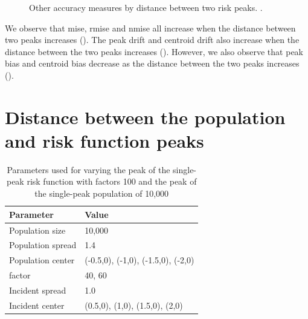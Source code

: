 \begin{figure}[htbp]
\begin{subfigure}[b]{0.49\textwidth}
        \caption{}
        \label{fig:other_measures:p1.4_100_G:centroid_drift}
    \end{subfigure}
    \caption[Other accuracy measures by distance between two risk peaks]
        {Other accuracy measures by distance between two risk peaks. \errorplotcaption.}
    \label{fig:other_measures:p1.4_100_G}
\end{figure}

We observe that \gls{mise}, \gls{rmise} and \gls{nmise} all increase when the distance between two peaks increases ().
The \gls{peak drift} and \gls{centroid drift} also increase when the distance between the two peaks increases ().
However, we also observe that \gls{peak bias} and \gls{centroid bias} decrease as the distance between the two peaks increases ().


\section{Distance between the population and risk function peaks}
\label{sec:results:p1.4_Gap_risk}

\begin{table}[htbp]
    \centering
    \begin{tabular}{ll}
        \toprule
        Parameter & Value \\
        \midrule
        Population size & 10,000 \\
        Population \gls{spread} & 1.4 \\
        Population center & (-0.5,0), (-1,0), (-1.5,0), (-2,0) \\
        \Gls{factor} & 40, 60 \\
        Incident \gls{spread} & 1.0 \\
        Incident center & (0.5,0), (1,0), (1.5,0), (2,0) \\
        \bottomrule
    \end{tabular}
    \caption{Parameters used for varying the peak of the single-peak risk function with \glspl{factor} 100 and the peak of the single-peak population of 10,000}
    \label{tab:params:p1.4_100_Gap_risk}
\end{table}

